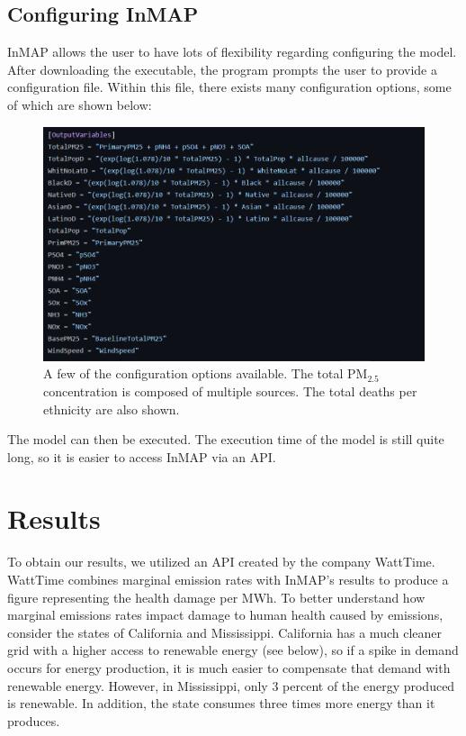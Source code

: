 \documentclass{article}
\begin{document}
\subsection{Configuring InMAP}

InMAP allows the user to have lots of flexibility regarding configuring the model. After downloading the executable,
the program prompts the user to provide a configuration file. Within this file, there exists many configuration options,
some of which are shown below:

\begin{figure}[h]
    \centering
    \includegraphics[width=\textwidth]{code.png}
    \caption{A few of the configuration options available. The total $\text{PM}_{2.5}$ concentration is composed of multiple
    sources. The total deaths per ethnicity are also shown.}
    \label{fig:grid2}
 \end{figure}

The model can then be executed. The execution time of the model is still quite long, so it is easier to access InMAP via an API.

\section{Results}

To obtain our results, we utilized an API created by the company WattTime. WattTime combines marginal emission rates with InMAP's results
to produce a figure representing the health damage per MWh. To better understand how marginal emissions rates impact damage to human health caused
by emissions, consider the states of California and Mississippi. California has a much cleaner grid with a higher access to renewable energy (see below), 
so if a spike in demand occurs for energy production, it is much easier to compensate that demand with renewable energy. However,
in Mississippi, only 3 percent of the energy produced is renewable. In addition, the state consumes three times more energy than it produces.
\end{document}
